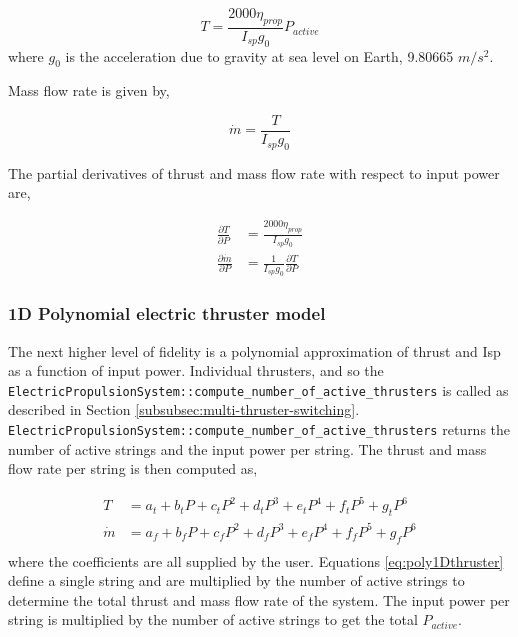 \begin{equation}
	T = \frac{2000 \eta_{prop}}{I_{sp} g_0} P_{active}
	\label{eq:fixed_efficiency_constant_Isp_thrust}
\end{equation}
%
where $g_0$ is the acceleration due to gravity at sea level on Earth, 9.80665 $m/s^2$.

Mass flow rate is given by,

\begin{equation}
\dot m = \frac{T}{I_{sp} g_0}
\label{eq:fixed_efficiency_constant_Isp_mdot}
\end{equation}

The partial derivatives of thrust and mass flow rate with respect to input power are,

\begin{align}
	\frac{\partial T}{\partial P} &= \frac{2000 \eta_{prop}}{I_{sp} g_0}\\
	\frac{\partial \dot m}{\partial P} &= \frac{1}{I_{sp} g_0}\frac{\partial T}{\partial P}
	\label{eq:fixed_efficiency_constant_Isp_derivatives}
\end{align}

\subsubsection{1D Polynomial electric thruster model}
\label{subsubsec:polynomial-electric-thruster}

The next higher level of fidelity is a polynomial approximation of thrust and \ac{Isp} as a function of input power. Individual thrusters, and so the \texttt{ElectricPropulsionSystem::compute\_number\_of\_active\_thrusters} is called as described in Section \ref{subsubsec:multi-thruster-switching}. \texttt{ElectricPropulsionSystem::compute\_number\_of\_active\_thrusters} returns the number of active strings and the input power per string. The thrust and mass flow rate per string is then computed as,

\begin{align}
	T &= a_t + b_t P + c_t P^2 + d_t P^3 + e_t P^4 + f_t P^5 + g_t P^6\\
	\dot m &= a_f + b_f P + c_f P^2 + d_f P^3 + e_f P^4 + f_f P^5 + g_f P^6\\
	\label{eq:poly1Dthruster}
\end{align}
%
where the coefficients are all supplied by the user. Equations \ref{eq:poly1Dthruster} define a single string and are multiplied by the number of active strings to determine the total thrust and mass flow rate of the system. The input power per string is multiplied by the number of active strings to get the total $P_{active}$.

